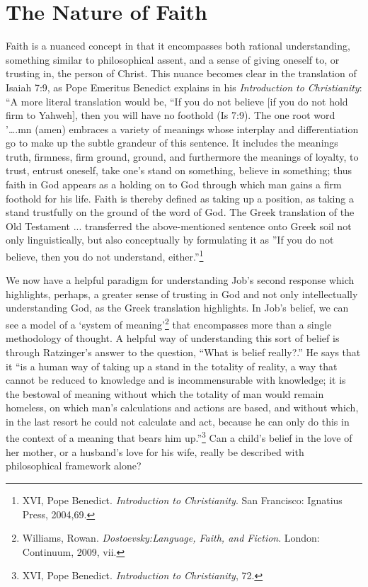 \section{The Nature of Faith}
Faith is a nuanced concept in that it encompasses both rational understanding, something similar to philosophical assent, and a sense of giving oneself to, or trusting in, the person of Christ. This nuance becomes clear in the translation of Isaiah 7:9, as Pope Emeritus Benedict explains in his \emph{Introduction to Christianity}: ``A more literal translation would be, ``If you do not believe [if you do not hold firm to Yahweh], then you will have no foothold (Is 7:9). The one root word '….mn (amen) embraces a variety of meanings whose interplay and differentiation go to make up the subtle grandeur of this sentence. It includes the meanings truth, firmness, firm ground, ground, and furthermore the meanings of loyalty, to trust, entrust oneself, take one's stand on something, believe in something; thus faith in God appears as a holding on to God through which man gains a firm foothold for his life. Faith is thereby defined as taking up a position, as taking a stand trustfully on the ground of the word of God. The Greek translation of the Old Testament ... transferred the above-mentioned sentence onto Greek soil not only linguistically, but also conceptually by formulating it as ''If you do not believe, then you do not understand, either.''\footnote{XVI, Pope Benedict. \emph{Introduction to Christianity}. San Francisco: Ignatius Press, 2004,69.}

We now have a helpful paradigm for understanding Job's second response which highlights, perhaps, a greater sense of trusting in God and not only intellectually understanding God, as the Greek translation highlights. In Job's belief, we can see a model of a `system of meaning'\footnote{Williams, Rowan. \emph{Dostoevsky:Language, Faith, and Fiction}. London: Continuum, 2009, vii.} that encompasses more than a single methodology of thought. A helpful way of understanding this sort of belief is through Ratzinger's answer to the question, ``What is belief really?.'' He says that it ``is a human way of taking up a stand in the totality of reality, a way that cannot be reduced to knowledge and is incommensurable with knowledge; it is the bestowal of meaning without which the totality of man would remain homeless, on which man's calculations and actions are based, and without which, in the last resort he could not calculate and act, because he can only do this in the context of a meaning that bears him up.''\footnote{XVI, Pope Benedict. \emph{Introduction to Christianity}, 72.} Can a child's belief in the love of her mother, or a husband's love for his wife, really be described with philosophical framework alone?

